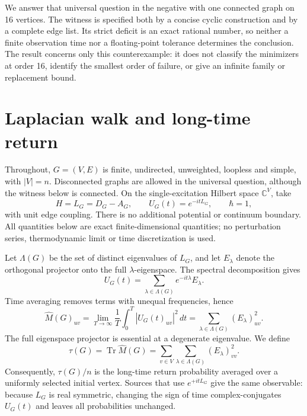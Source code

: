 \documentclass[11pt]{article}
\newcommand{\Mhat}{\widehat M}
\newcommand{\C}{\mathbb{C}}
\newcommand{\Tr}{\operatorname{Tr}}
\begin{document}
We answer that universal question in the negative with one connected graph
on 16 vertices.  The witness is specified both by a concise cyclic
construction and by a complete edge list.  Its strict deficit is an exact
rational number, so neither a finite observation time nor a floating-point
tolerance determines the conclusion.  The result concerns only this
counterexample: it does not classify the minimizers at order 16, identify the
smallest order of failure, or give an infinite family or replacement bound.

\section{Laplacian walk and long-time return}
\label{sec:model}

Throughout, $G=(V,E)$ is finite, undirected, unweighted, loopless and simple,
with $|V|=n$.  Disconnected graphs are allowed in the universal question,
although the witness below is connected.  On the single-excitation Hilbert
space $\C^V$, take
\[
  H=L_G=D_G-A_G,\qquad U_G(t)=e^{-itL_G},\qquad \hbar=1,
\]
with unit edge coupling.  There is no additional potential or continuum
boundary.  All quantities below are exact finite-dimensional quantities; no
perturbation series, thermodynamic limit or time discretization is used.

Let $\Lambda(G)$ be the set of distinct eigenvalues of $L_G$, and let
$E_\lambda$ denote the orthogonal projector onto the full
$\lambda$-eigenspace.  The spectral decomposition gives
\[
  U_G(t)=\sum_{\lambda\in\Lambda(G)}e^{-it\lambda}E_\lambda.
\]
Time averaging removes terms with unequal frequencies, hence
\begin{equation}
  \Mhat(G)_{uv}
  =\lim_{T\to\infty}\frac1T\int_0^T|U_G(t)_{uv}|^2\,dt
  =\sum_{\lambda\in\Lambda(G)}(E_\lambda)_{uv}^{2}.
  \label{eq:average-mixing}
\end{equation}
The full eigenspace projector is essential at a degenerate eigenvalue.  We
define
\begin{equation}
  \tau(G)=\Tr\Mhat(G)
  =\sum_{v\in V}\sum_{\lambda\in\Lambda(G)}(E_\lambda)_{vv}^{2}.
  \label{eq:tau}
\end{equation}
Consequently, $\tau(G)/n$ is the long-time return probability averaged over a
uniformly selected initial vertex.  Sources that use $e^{+itL_G}$ give the
same observable: because $L_G$ is real symmetric, changing the sign of time
complex-conjugates $U_G(t)$ and leaves all probabilities unchanged.
\end{document}
